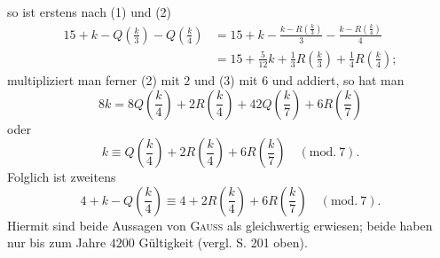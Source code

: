 \endgroup
\noindent so ist erstens nach (1) und (2)
\[
\begin{aligned}
15+k-Q\left(\frac{k}{3}\right)-Q\left(\frac{k}{4}\right)
&=15+k-\frac{k-R\left(\frac{k}{3}\right)}{3}-\frac{k-R\left(\frac{k}{4}\right)}{4}\\
&=15+\frac{5}{12}k+\frac{1}{3}R\left(\frac{k}{3}\right)+\frac{1}{4}R\left(\frac{k}{4}\right);
\end{aligned}
\]
\noindent multipliziert man ferner (2) mit $2$ und (3) mit $6$ und addiert, so hat man
\[
8k=8Q\left(\frac{k}{4}\right)+2R\left(\frac{k}{4}\right)+42Q\left(\frac{k}{7}\right)+6R\left(\frac{k}{7}\right)
\]
\noindent oder
\[
k\equiv Q\left(\frac{k}{4}\right)+2R\left(\frac{k}{4}\right)+6R\left(\frac{k}{7}\right)\quad(\text{mod.}\ 7).
\]
\noindent Folglich ist zweitens
\[
4+k-Q\left(\frac{k}{4}\right)\equiv4+2R\left(\frac{k}{4}\right)+6R\left(\frac{k}{7}\right)\quad(\text{mod.}\ 7).
\]
\clearpage{}
\noindent Hiermit sind beide Aussagen von \textsc{Gauss} als gleichwertig erwiesen; beide haben nur bis zum Jahre $4200$ Gültigkeit (vergl. S. 201 oben).


